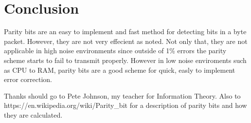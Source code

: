 \documentclass{article}
\begin{document}
   \section{Conclusion}
      Parity bits are an easy to implement and fast method for detecting bits
      in a byte packet. However, they are not very effecient as noted. Not only
      that, they are not applicable in high noise environments since outside of
      1\% errors the parity scheme starts to fail to transmit properly. However
      in low noise enviroments such as CPU to RAM, parity bits are a good scheme
      for quick, easly to implement error correction.
      
      Thanks should go to Pete Johnson, my teacher for Information Theory. Also
      to https://en.wikipedia.org/wiki/Parity\_bit for a description of parity
      bits and how they are calculated.
\end{document}
